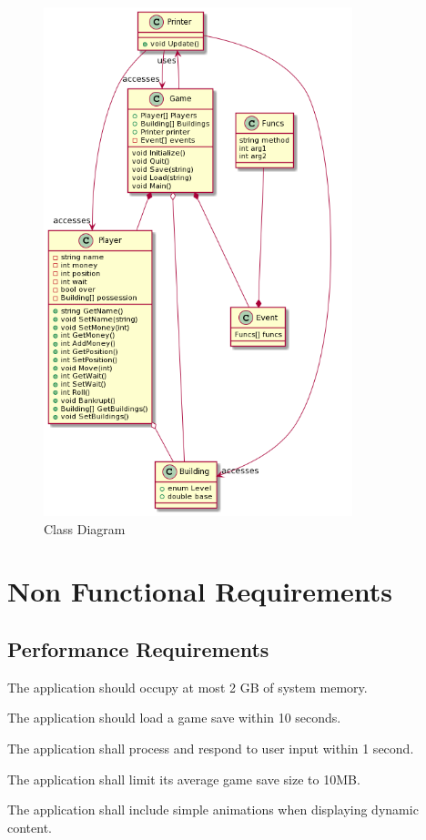       \begin{figure}[ht!]
        \centering
        \includegraphics[width=0.8\textwidth]{image/UML.png}
        \caption{Class Diagram}
        \label{fig:class-diagram}
      \end{figure}
  
  \section{Non Functional Requirements}

    \subsection{Performance Requirements}
      \begin{enumerate}[label=\texttt{[NFUNC-REQ-\arabic*]}:, leftmargin=10em]
        \item The application should occupy at most 2 GB of system memory.
        \item The application should load a game save within 10 seconds.
        \item The application shall process and respond to user input within 1 second.
        \item The application shall limit its average game save size to 10MB.
        \item The application shall include simple animations when displaying dynamic content.
      \end{enumerate}

